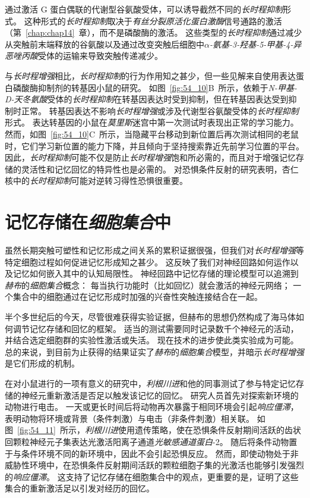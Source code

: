 通过激活 G 蛋白偶联的代谢型谷氨酸受体，可以诱导截然不同的\textit{长时程抑制}形式。
这种形式的\textit{长时程抑制}取决于\textit{\textit{有丝分裂原活化蛋白激酶}}信号通路的激活（第~\ref{chap:chap14}~章），而不是磷酸酶的激活。
这些类型的\textit{长时程抑制}通过减少从突触前末端释放的谷氨酸以及通过改变突触后细胞中\textit{$\alpha$-氨基-3-羟基-5-甲基-4-异恶唑丙酸}受体的运输来导致突触传递减少。


与\textit{长时程增强}相比，\textit{长时程抑制}的行为作用知之甚少，但一些见解来自使用表达蛋白磷酸酶抑制剂的转基因小鼠的研究。
如图~\ref{fig:54_10}B~所示，依赖于\textit{N-甲基-D-天冬氨酸}受体的\textit{长时程抑制}在转基因表达时受到抑制，但在转基因表达受到抑制时正常。
转基因表达不影响\textit{长时程增强}或涉及代谢型谷氨酸受体的\textit{长时程抑制}形式。
表达转基因的小鼠在\textit{莫里斯}迷宫中第一次测试时表现出正常的学习能力。
然而，如图~\ref{fig:54_10}C~所示，当隐藏平台移动到新位置后再次测试相同的老鼠时，它们学习新位置的能力下降，并且倾向于坚持搜索靠近先前学习位置的平台。
因此，\textit{长时程抑制}可能不仅是防止\textit{长时程增强}饱和所必需的，而且对于增强记忆存储的灵活性和记忆回忆的特异性也是必需的。
对恐惧条件反射的研究表明，杏仁核中的\textit{长时程抑制}可能对逆转习得性恐惧很重要。



\section{记忆存储在\textit{细胞集合}中}

虽然长期突触可塑性和记忆形成之间关系的累积证据很强，但我们对\textit{长时程增强}等特定细胞过程如何促进记忆形成知之甚少。
这反映了我们对神经回路如何运作以及记忆如何嵌入其中的认知局限性。
神经回路中记忆存储的理论模型可以追溯到\textit{赫布}的\textit{细胞集合}概念：
每当执行功能时（比如回忆）就会激活的神经元网络；
一个集合中的细胞通过在记忆形成时加强的兴奋性突触连接结合在一起。


半个多世纪后的今天，尽管很难获得实验证据，但赫布的思想仍然构成了海马体如何调节记忆存储和回忆的框架。
适当的测试需要同时记录数千个神经元的活动，并结合选定细胞群的实验性激活或失活。
现在技术的进步使此类实验成为可能。
总的来说，到目前为止获得的结果证实了\textit{赫布}的\textit{细胞集合}模型，并暗示\textit{长时程增强}是它们形成的机制。


在对小鼠进行的一项有意义的研究中，\textit{利根川进}和他的同事测试了参与特定记忆存储的神经元重新激活是否足以触发该记忆的回忆。
研究人员首先对探索新环境的动物进行电击。
一天或更长时间后将动物再次暴露于相同环境会引起\textit{响应僵滞}，表明动物将环境或背景（条件刺激）与电击（非条件刺激）相关联。
如图~\ref{fig:54_11}~所示，\textit{利根川进}使用遗传策略，使在恐惧条件反射期间活跃的齿状回颗粒神经元子集表达光激活阳离子通道\textit{光敏感通道蛋白}-2。
随后将条件动物置于与条件环境不同的新环境中，因此不会引起恐惧反应。
然而，即使动物处于非威胁性环境中，在恐惧条件反射期间活跃的颗粒细胞子集的光激活也能够引发强烈的\textit{响应僵滞}。
这支持了记忆存储在细胞集合中的观点，更重要的是，证明了这些集合的重新激活足以引发对经历的回忆。


